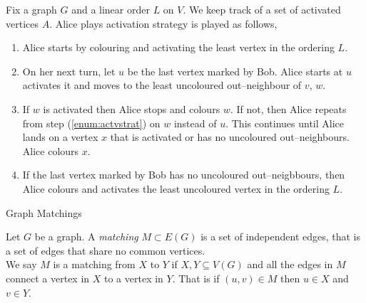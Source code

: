 \documentclass{beamer}
\begin{document}

\begin{frame}{\secname}
    Fix a graph $G$ and a linear order $L$ on $V$. We keep track of a set of activated vertices $A$. Alice plays activation strategy is played as follows,
    \begin{enumerate}
        \item Alice starts by colouring and activating the least vertex in the ordering $L$.
        \item On her next turn, let $u$ be the last vertex marked by Bob.  Alice starts at $u$ activates it and moves to the least uncoloured out--neighbour of $v$, $w$. \label{enum:actvstrat}
        \item If $w$ is activated then Alice stops and colours $w$. If not, then Alice repeats from step (\ref{enum:actvstrat}) on $w$ instead of $u$. 
        This continues until Alice lands on a vertex $x$ that is activated or has no uncoloured out--neighbours. Alice colours $x$.
        \item If the last vertex marked by Bob has no uncoloured out--neigbbours, then Alice colours and activates the least uncoloured vertex in the ordering $L$.
    \end{enumerate}
\end{frame}


\begin{frame}{\secname}{Graph Matchings}
    
    
    \begin{definition}[Matching]
        Let $G$ be a graph. A \textit{matching} $M\subset E(G)$ is a set of independent edges, that is a set of edges that share no common vertices.\\
        
         We say $M$ is a matching from $X$ to $Y$ if $X,Y\subseteq V(G)$ and all the edges in $M$ connect a vertex in $X$ to a vertex in $Y$. That is if $(u,v)\in M$ then $u\in X$ and $v\in Y$. 
        
    \end{definition}

\end{frame}
\end{document}
